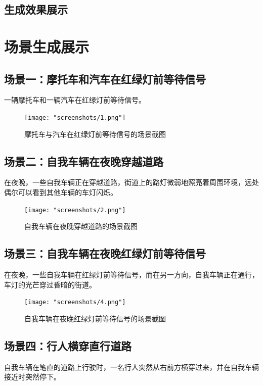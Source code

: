 \documentclass{article}
\begin{document}
\subsection{生成效果展示}
\section{场景生成展示}

\subsection{场景一：摩托车和汽车在红绿灯前等待信号}
\indent 一辆摩托车和一辆汽车在红绿灯前等待信号。\\

\begin{figure}[H]
	\centering
	\texttt{[image: "screenshots/1.png"]}
	\caption{摩托车与汽车在红绿灯前等待信号的场景截图}
	\label{fig:redlight_motorbike_car}
\end{figure}

\subsection{场景二：自我车辆在夜晚穿越道路}
\indent 在夜晚，一些自我车辆正在穿越道路，街道上的路灯微弱地照亮着周围环境，远处偶尔可以看到其他车辆的车灯闪烁。\\

\begin{figure}[H]
	\centering
	\texttt{[image: "screenshots/2.png"]}
	\caption{自我车辆在夜晚穿越道路的场景截图}
	\label{fig:night_self_driving_cross}
\end{figure}

\subsection{场景三：自我车辆在夜晚红绿灯前等待信号}
\indent 在夜晚，一些自我车辆在红绿灯前等待信号，而在另一方向，自我车辆正在通行，车灯的光芒穿过昏暗的街道。\\

\begin{figure}[H]
	\centering
	\texttt{[image: "screenshots/4.png"]}
	\caption{自我车辆在夜晚红绿灯前等待信号的场景截图}
	\label{fig:night_redlight_cross}
\end{figure}

\subsection{场景四：行人横穿直行道路}
\indent 自我车辆在笔直的道路上行驶时，一名行人突然从右前方横穿过来，并在自我车辆接近时突然停下。\\
\end{document}
